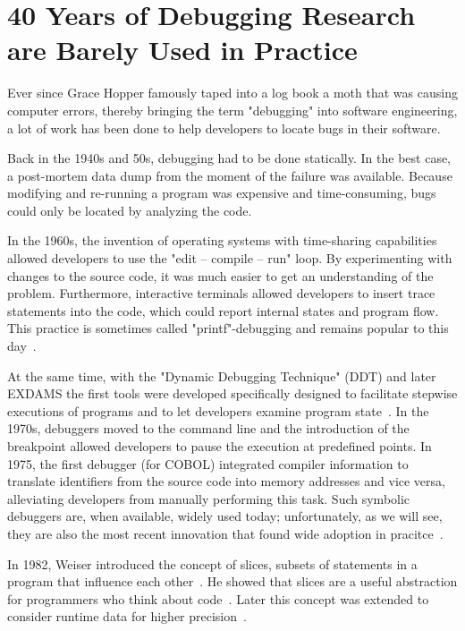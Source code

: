 
\section{40 Years of Debugging Research are Barely Used in Practice}

Ever since Grace Hopper famously taped into a log book a moth that was causing computer errors, thereby bringing the term "debugging" into software engineering, a lot of work has been done to help developers to locate bugs in their software.

Back in the 1940s and 50s, debugging had to be done statically.
In the best case, a post-mortem data dump from the moment of the failure was available.
Because modifying and re-running a program was expensive and time-consuming, bugs could only be located by analyzing the code.

In the 1960s, the invention of operating systems with time-sharing capabilities allowed developers to use the "edit -- compile -- run" loop.
By experimenting with changes to the source code, it was much easier to get an understanding of the problem.
Furthermore, interactive terminals allowed developers to insert trace statements into the code, which could report internal states and program flow.
This practice is sometimes called "printf"-debugging and remains popular to this day~\cite{perscheid_17_studying_the_advancement}.

At the same time, with the "Dynamic Debugging Technique" (DDT) and later EXDAMS the first tools were developed specifically designed to facilitate stepwise executions of programs and to let developers examine program state~\cite{balzer_69_exdams_extendable_debugging}.
In the 1970s, debuggers moved to the command line and the introduction of the breakpoint allowed developers to pause the execution at predefined points.
In 1975, the first debugger (for COBOL) integrated compiler information to translate identifiers from the source code into memory addresses and vice versa, alleviating developers from manually performing this task.
Such symbolic debuggers are, when available, widely used today; unfortunately, as we will see, they are also the most recent innovation that found wide adoption in pracitce~\cite{perscheid_17_studying_the_advancement}.

In 1982, Weiser introduced the concept of slices, subsets of statements in a program that influence each other~\cite{weiser_81_program_slicing}. 
He showed that slices are a useful abstraction for programmers who think about code~\cite{weiser_82_programmers_use_slices_when}.
Later this concept was extended to consider runtime data for higher precision~\cite{agrawal_90_dynamic_program_slicing, korel_90_dynamic_slicing_of_computer}.

